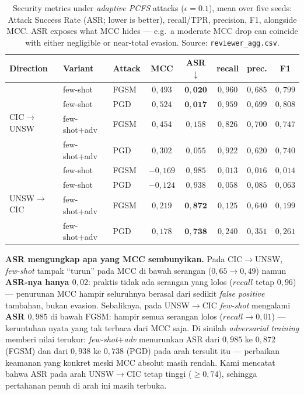 \documentclass[11pt,a4paper]{article}
\begin{document}
\begin{table}[h]
\centering
\caption{Security metrics under \emph{adaptive PCFS} attacks ($\epsilon{=}0.1$), mean
over five seeds: Attack Success Rate (ASR; lower is better), recall/TPR, precision,
F1, alongside MCC. ASR exposes what MCC hides --- e.g.\ a moderate MCC drop can
coincide with either negligible or near-total evasion. Source:
\texttt{reviewer\_agg.csv}.}
\label{tab:advmetrics}
\small
\begin{tabular}{lllccccc}
\toprule
Direction & Variant & Attack & MCC & ASR$\downarrow$ & recall & prec. & F1 \\
\midrule
\multirow{4}{*}{CIC$\rightarrow$UNSW}
 & few-shot     & FGSM & $0{,}493$ & $\mathbf{0{,}020}$ & $0{,}960$ & $0{,}685$ & $0{,}799$ \\
 & few-shot     & PGD  & $0{,}524$ & $\mathbf{0{,}017}$ & $0{,}959$ & $0{,}699$ & $0{,}808$ \\
 & few-shot+adv & FGSM & $0{,}454$ & $0{,}158$ & $0{,}826$ & $0{,}700$ & $0{,}747$ \\
 & few-shot+adv & PGD  & $0{,}302$ & $0{,}055$ & $0{,}922$ & $0{,}620$ & $0{,}740$ \\
\midrule
\multirow{4}{*}{UNSW$\rightarrow$CIC}
 & few-shot     & FGSM & $-0{,}169$ & $0{,}985$ & $0{,}013$ & $0{,}016$ & $0{,}014$ \\
 & few-shot     & PGD  & $-0{,}124$ & $0{,}938$ & $0{,}058$ & $0{,}085$ & $0{,}063$ \\
 & few-shot+adv & FGSM & $0{,}219$ & $\mathbf{0{,}872}$ & $0{,}125$ & $0{,}640$ & $0{,}199$ \\
 & few-shot+adv & PGD  & $0{,}178$ & $\mathbf{0{,}738}$ & $0{,}240$ & $0{,}351$ & $0{,}261$ \\
\bottomrule
\end{tabular}
\end{table}

\noindent\textbf{ASR mengungkap apa yang MCC sembunyikan.} Pada
CIC$\rightarrow$UNSW, \emph{few-shot} tampak ``turun'' pada MCC di bawah serangan
($0{,}65\rightarrow0{,}49$) namun \textbf{ASR-nya hanya $0{,}02$}: praktis tidak ada
serangan yang lolos ($recall$ tetap $0{,}96$) --- penurunan MCC hampir seluruhnya
berasal dari sedikit \emph{false positive} tambahan, bukan evasion. Sebaliknya, pada
UNSW$\rightarrow$CIC \emph{few-shot} mengalami \textbf{ASR $0{,}985$} di bawah FGSM:
hampir semua serangan lolos ($recall\rightarrow0{,}01$) --- keruntuhan nyata yang
tak terbaca dari MCC saja. Di sinilah \emph{adversarial training} memberi nilai
terukur: \emph{few-shot$+$adv} menurunkan ASR dari $0{,}985$ ke $0{,}872$ (FGSM) dan
dari $0{,}938$ ke $0{,}738$ (PGD) pada arah tersulit itu --- perbaikan keamanan yang
konkret meski MCC absolut masih rendah. Kami mencatat bahwa ASR pada arah
UNSW$\rightarrow$CIC tetap tinggi ($\ge0{,}74$), sehingga pertahanan penuh di arah
ini masih terbuka.
\end{document}
